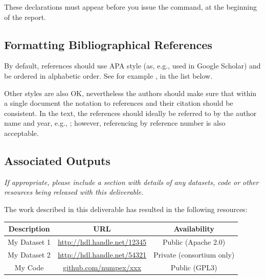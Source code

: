 These declarations must appear before you issue the  command, at the beginning of the report.

\subsection{Formatting Bibliographical References}
\label{sec:formatting-bibliographical-references}

By default, references should use APA style (as, e.g., used in Google Scholar) and be ordered in alphabetic order. See for example \cite{bib:tan2004}, in the list below.

Other styles are also OK, nevertheless the authors should make sure that within a single document the notation to references and their citation should be consistent. In the text, the references should ideally be referred to by the author name and year, e.g., \cite{bib:lamport1994}; however, referencing by reference number is also acceptable.

\subsection{Associated Outputs}
\label{sec:associated-outputs}

\textit{If appropriate, please include a section with details of any datasets, code or other resources being released with this deliverable.}

The work described in this deliverable has resulted in the following resources:

\begin{center}
    \def\arraystretch{1.25}
    \begin{tabular}{|c|c|c|}
        \hline
        \rowcolor{numpexgray}
        \color{white} Description &
        \color{white} URL &
        \color{white} Availability
        \\\hline

        \rowcolor{white}\color{numpexfont}
        My Dataset 1 &
        \url{http://hdl.handle.net/12345} &
        Public (Apache 2.0) \\

        \rowcolor{numpexlightergray}\color{numpexfont}
        My Dataset 2 &
        \url{http://hdl.handle.net/54321} &
        Private (consortium only) \\

        \rowcolor{white}\color{numpexfont}
        My Code &
        \url{github.com/numpex/xxx} &
        Public (GPL3) \\

        \hline
    \end{tabular}
\end{center}


